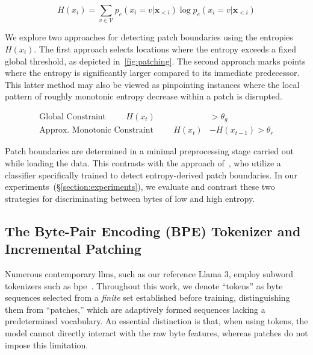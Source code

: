 \begin{equation}
H(x_i) = \sum_{v \in \mathcal{V}} p_{e}(x_i=v|\pmb{x}_{<i}) \log p_{e}(x_i=v|\pmb{x}_{<i})
\end{equation}

We explore two approaches for detecting patch boundaries using the entropies $H(x_i)$. The first approach selects locations where the entropy exceeds a fixed global threshold, as depicted in~\autoref{fig:patching}. The second approach marks points where the entropy is significantly larger compared to its immediate predecessor. This latter method may also be viewed as pinpointing instances where the local pattern of roughly monotonic entropy decrease within a patch is disrupted.

\begin{align*}
    \text{Global Constraint}\hspace{1cm}H(x_t)& > \theta_g\\
    \text{Approx. Monotonic Constraint}\hspace{1cm}H(x_t)& - H(x_{t-1}) > \theta_r
\end{align*}

Patch boundaries are determined in a minimal preprocessing stage carried out while loading the data. This contrasts with the approach of~\citet{nawrot-etal-2023-efficient}, who utilize a classifier specifically trained to detect entropy-derived patch boundaries. In our experiments~(\S\ref{section:experiments}), we evaluate and contrast these two strategies for discriminating between bytes of low and high entropy.

\subsection{The Byte-Pair Encoding (BPE) Tokenizer and Incremental Patching}
\label{section:incremental-patching}
\label{section:bpe-patch}

Numerous contemporary llms, such as our reference Llama 3, employ subword tokenizers such as bpe~\citep{gage1994new, sennrich-etal-2016-neural}. Throughout this work, we denote ``tokens'' as byte sequences selected from a \textit{finite} set established before training, distinguishing them from ``patches,'' which are adaptively formed sequences lacking a predetermined vocabulary. An essential distinction is that, when using tokens, the model cannot directly interact with the raw byte features, whereas patches do not impose this limitation.

